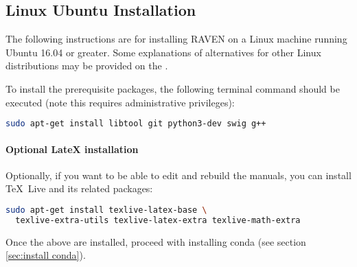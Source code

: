 \subsection{Linux Ubuntu Installation}
\label{sec:install ubunutu}
The following instructions are for installing RAVEN on a Linux machine running Ubuntu 16.04 or greater.  Some
explanations of alternatives for other Linux distributions may be provided on the \wiki.

To install the prerequisite packages, the following terminal command should be executed (note this requires
administrative privileges):

\begin{lstlisting}[language=bash]
 sudo apt-get install libtool git python3-dev swig g++
\end{lstlisting}

\paragraph{Optional LateX installation}
Optionally, if you want to be able to edit and rebuild the manuals, you can
install \TeX~Live and its related packages:
\begin{lstlisting}[language=bash]
  sudo apt-get install texlive-latex-base \
  texlive-extra-utils texlive-latex-extra texlive-math-extra
\end{lstlisting}

Once the above are installed, proceed with installing conda (see section \ref{sec:install conda}).
